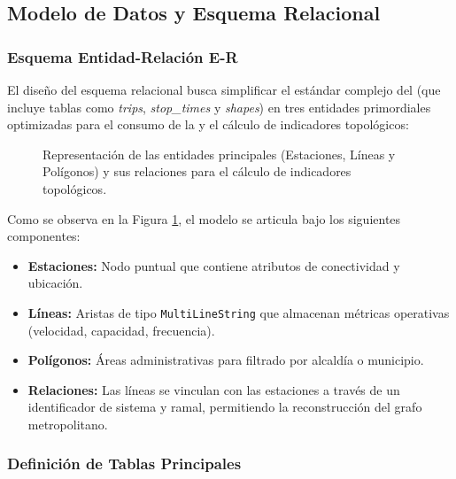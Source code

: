 \subsection{Modelo de Datos y Esquema Relacional}
\label{subsec:modelo-datos}

\subsubsection{Esquema Entidad-Relación E-R}
\label{subsubsec:EsquemaER}

El diseño del esquema relacional busca simplificar el estándar complejo del \gtfs{} (que incluye tablas como \textit{trips}, \textit{stop\_times} y \textit{shapes}) en tres entidades primordiales optimizadas para el consumo de la \api{} y el cálculo de indicadores topológicos:

\begin{figure}[H]
    \centering
    \caption[Esquema Relacional Simplificado de Apimetro]{Representación de las entidades principales (Estaciones, Líneas y Polígonos) y sus relaciones para el cálculo de indicadores topológicos.}
    \label{fig:diagrama-er}
\end{figure}


Como se observa en la Figura \ref{fig:diagrama-er}, el modelo se articula bajo los siguientes componentes:

\begin{itemize} 
    \item \textbf{Estaciones:} Nodo puntual que contiene atributos de conectividad y ubicación. 
    \item \textbf{Líneas:} Aristas de tipo \texttt{MultiLineString} que almacenan métricas operativas (velocidad, capacidad, frecuencia). 
    \item \textbf{Polígonos:} Áreas administrativas para filtrado por alcaldía o municipio. 
    \item \textbf{Relaciones:} Las líneas se vinculan con las estaciones a través de un identificador de sistema y ramal, permitiendo la reconstrucción del grafo metropolitano.
\end{itemize}


\subsubsection{Definición de Tablas Principales}
\label{subsubsec:DefinicionSQL}

